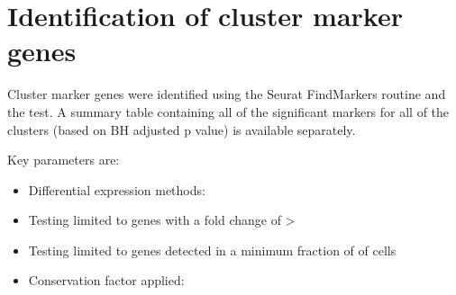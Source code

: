 \section{Identification of cluster marker genes}

Cluster marker genes were identified using the Seurat FindMarkers routine and the \deTest{} test. A summary table containing all of the significant markers for all of the clusters (based on BH adjusted p value) is available separately.

Key parameters are:

\begin{itemize}
\item Differential expression methods: \deTest
\item Testing limited to genes with a fold change of > \threshUse
\item Testing limited to genes detected in a minimum fraction of \minPct{} of cells
\item Conservation factor applied: \conservedFactor
\end{itemize}

\clearpage